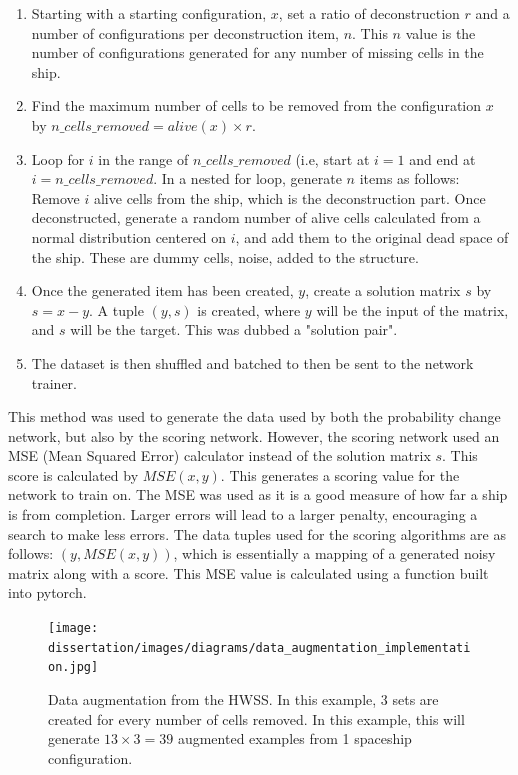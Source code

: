 \documentclass{l4proj}
\begin{document}
\begin{enumerate}
    \item Starting with a starting configuration, $x$, set a ratio of deconstruction $r$ and a number of configurations per deconstruction item, $n$. This $n$ value is the number of configurations generated for any number of missing cells in the ship.
    \item Find the maximum number of cells to be removed from the configuration $x$ by $n\_cells\_removed = alive(x) \times r$.
    \item Loop for $i$ in the range of $n\_cells\_removed$ (i.e, start at $i=1$ and end at $i = n\_cells\_removed$. In a nested for loop, generate $n$ items as follows: Remove $i$ alive cells from the ship, which is the deconstruction part. Once deconstructed, generate a random number of alive cells calculated from a normal distribution centered on $i$, and add them to the original dead space of the ship. These are dummy cells, noise, added to the structure.
    \item Once the generated item has been created, $y$, create a solution matrix $s$ by $s = x - y$. A tuple $(y, s)$ is created, where $y$ will be the input of the matrix, and $s$ will be the target. This was dubbed a "solution pair".
    \item The dataset is then shuffled and batched to then be sent to the network trainer.
\end{enumerate}

This method was used to generate the data used by both the probability change network, but also by the scoring network. However, the scoring network used an MSE (Mean Squared Error) calculator instead of the solution matrix $s$. This score is calculated by $MSE(x, y)$. This generates a scoring value for the network to train on. The MSE was used as it is a good measure of how far a ship is from completion. Larger errors will lead to a larger penalty, encouraging a search to make less errors. The data tuples used for the scoring algorithms are as follows: $(y, MSE(x, y))$, which is essentially a mapping of a generated noisy matrix along with a score. This MSE value is calculated using a function built into pytorch.

\begin{figure}[h!]
\centering
\texttt{[image: dissertation/images/diagrams/data\_augmentation\_implementation.jpg]}
\caption{Data augmentation from the HWSS. In this example, 3 sets are created for every number of cells removed. In this example, this will generate $13 \times 3 = 39$ augmented examples from 1 spaceship configuration.}
\label{fig:subim1}
\end{figure}
\end{document}
